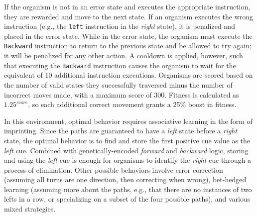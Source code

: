 If the organism is not in an error state and executes the appropriate instruction, they are rewarded and move to the next state. 
If an organism executes the wrong instruction (e.g., the \texttt{left} instruction in the \textit{right} state), it is penalized and placed in the error state. 
While in the error state, the organism must execute the \texttt{Backward} instruction to return to the previous state and be allowed to try again; it will be penalized for any other action. 
A cooldown is applied, however, such that executing the \texttt{Backward} instruction causes the organism to wait for the equivalent of 10 additional instruction executions.
Organisms are scored based on the number of valid states they successfully traversed minus the number of incorrect moves made, with a maximum score of 300. 
Fitness is calculated as $1.25^{score}$, so each additional correct movement grants a 25\% boost in fitness.



In this environment, optimal behavior requires associative learning in the form of imprinting. 
Since the paths are guaranteed to have a \textit{left} state before a \textit{right} state, the optimal behavior is to find and store the first positive cue value as the \textit{left} cue.
Combined with genetically-encoded \textit{forward} and \textit{backward} logic, storing and using the \textit{left} cue is enough for organisms to identify the \textit{right} cue through a process of elimination. %
Other possible behaviors involve error correction (assuming all turns are one direction, then correcting when wrong), bet-hedged learning (assuming more about the paths, e.g., that there are no instances of two lefts in a row, or specializing on a subset of the four possible paths), and various mixed strategies. 

